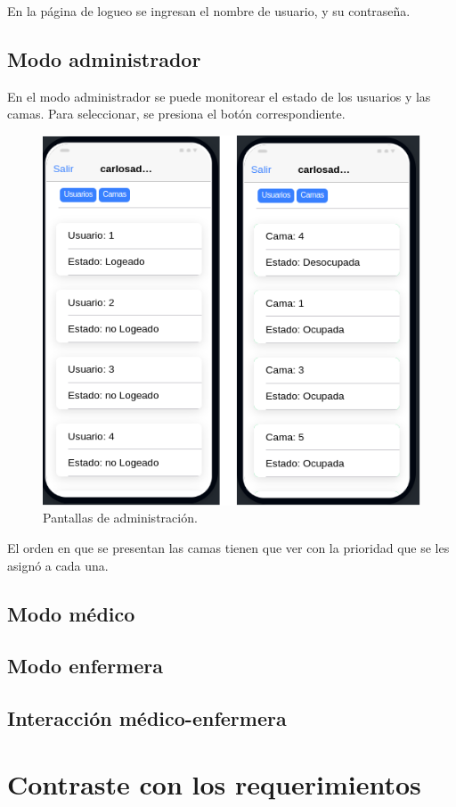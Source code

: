 En la página de logueo se ingresan el nombre de usuario, y su contraseña.


\subsection{Modo administrador}
En el modo administrador se puede monitorear el estado de los usuarios y las camas. Para seleccionar, se presiona el botón correspondiente.

\begin{figure}[ht]
	\centering
	\includegraphics[scale=.70]{./Figures/app/administracion.png}
	\caption{ Pantallas de administración.}
	\label{fig: Pantallas de administración.}
\end{figure} 

El orden en que se presentan las camas tienen que ver con la prioridad que se les asignó a cada una.




\subsection{Modo médico}
\subsection{Modo enfermera}
\subsection{Interacción médico-enfermera}
\pagebreak
\section{Contraste con los requerimientos}


